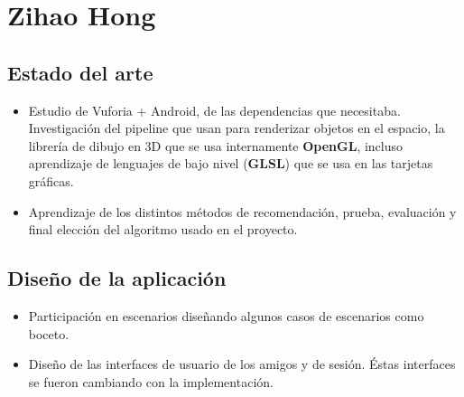 \section{Zihao Hong}
\label{makereference7.4}
    \subsection{Estado del arte}
    \label{makereference7.4.1}
        \begin{itemize}
            \item Estudio de Vuforia + Android, de las dependencias que necesitaba. Investigación del pipeline 
            que usan para renderizar objetos en el espacio, la librería de dibujo en 3D que se usa internamente \textbf{OpenGL}, 
            incluso aprendizaje de lenguajes de bajo nivel (\textbf{GLSL}) que se usa en las tarjetas gráficas.
            \item Aprendizaje de los distintos métodos de recomendación, prueba, evaluación y final elección del algoritmo usado en el proyecto.  
        \end{itemize}
    \subsection{Diseño de la aplicación}
    \label{makereference7.4.2}
        \begin{itemize}
            \item Participación en escenarios diseñando algunos casos de escenarios como boceto.
            \item Diseño de las interfaces de usuario de los amigos y de sesión. Éstas interfaces se fueron cambiando con la implementación.
        \end{itemize}
